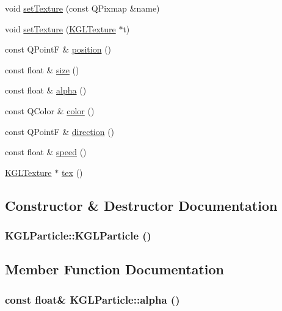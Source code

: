 \begin{CompactItemize}
\item 
void \hyperlink{class_k_g_l_particle_ff9e1c4f5c6d3a8a26f1a30e59a0e48b}{setTexture} (const QPixmap \&name)
\item 
void \hyperlink{class_k_g_l_particle_02f5c7f2b11ac94573570af130d0fe33}{setTexture} (\hyperlink{class_k_g_l_texture}{KGLTexture} $\ast$t)
\item 
const QPointF \& \hyperlink{class_k_g_l_particle_7fd9f005de276e58245475175b23b2e2}{position} ()
\item 
const float \& \hyperlink{class_k_g_l_particle_8597d2785cedd9cb5bb40b7d45510e07}{size} ()
\item 
const float \& \hyperlink{class_k_g_l_particle_82f20a264844ee28b6add85a5cb3842c}{alpha} ()
\item 
const QColor \& \hyperlink{class_k_g_l_particle_b9f25fd03e317c0125fde5c57674eebe}{color} ()
\item 
const QPointF \& \hyperlink{class_k_g_l_particle_5dd92029982c4c3fd095f089626b6650}{direction} ()
\item 
const float \& \hyperlink{class_k_g_l_particle_1a612ce49af0dd6dc80ff224ee9fd2d8}{speed} ()
\item 
\hyperlink{class_k_g_l_texture}{KGLTexture} $\ast$ \hyperlink{class_k_g_l_particle_f6e6914d833ff48e1b6ee719a5b15962}{tex} ()
\end{CompactItemize}


\subsection{Constructor \& Destructor Documentation}
\hypertarget{class_k_g_l_particle_0b2a6cb94ef297c99e6471dd91a1376d}{
\subsubsection[{KGLParticle}]{\setlength{\rightskip}{0pt plus 5cm}KGLParticle::KGLParticle ()}}
\label{class_k_g_l_particle_0b2a6cb94ef297c99e6471dd91a1376d}




\subsection{Member Function Documentation}
\hypertarget{class_k_g_l_particle_82f20a264844ee28b6add85a5cb3842c}{
\subsubsection[{alpha}]{\setlength{\rightskip}{0pt plus 5cm}const float\& KGLParticle::alpha ()}}
\label{class_k_g_l_particle_82f20a264844ee28b6add85a5cb3842c}



